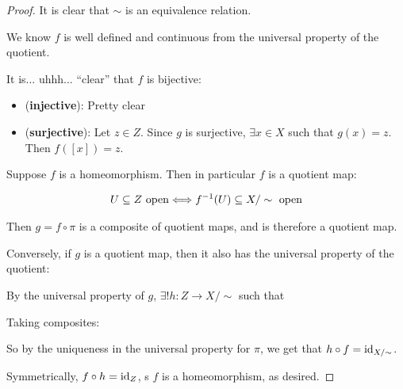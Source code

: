 \documentclass[12pt, twosided]{article}
\begin{document}
\begin{proof}
  It is clear that \(\sim\) is an equivalence relation.

  We know \(f\) is well defined and continuous from the universal property of the quotient.

  It is... uhhh... ``clear'' that \(f\) is bijective:
  \begin{itemize}
  \item (\textbf{injective}): Pretty clear
  \item (\textbf{surjective}): Let \(z \in Z\). Since \(g\) is surjective, \(\exists x \in X\) such that \(g(x) = z\). Then \(f([x]) = z\).
  \end{itemize}

  Suppose \(f\) is a homeomorphism. Then in particular \(f\) is a quotient map:

  \begin{align*}
    U \subseteq Z \text{ open} \Longleftrightarrow f^{-1}(U) \subseteq X/\sim\text{ open}
  \end{align*}

  Then \(g = f \circ \pi\) is a composite of quotient maps, and is therefore a quotient map.

  Conversely, if \(g\) is a quotient map, then it also has the universal property of the quotient:

  By the universal property of \(g\), \(\exists ! h: Z \to X/\sim\) such that

  \begin{center}
  \end{center}

  Taking composites:

    \begin{center}
  \end{center}
  So by the uniqueness in the universal property for \(\pi\), we get that \(h \circ f = \mathrm{id}_{X/\sim}\).

  Symmetrically, \(f \circ h = \mathrm{id}_Z\), s \(f\) is a homeomorphism, as desired.
\end{proof}
\end{document}
